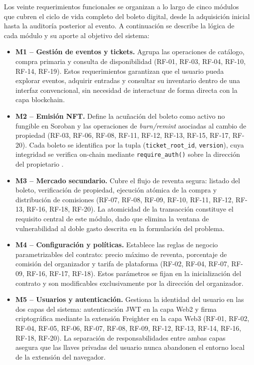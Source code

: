 Los veinte requerimientos funcionales se organizan a lo largo de cinco módulos que cubren el ciclo de vida
completo del boleto digital, desde la adquisición inicial hasta la auditoría posterior al evento. A
continuación se describe la lógica de cada módulo y su aporte al objetivo del sistema:

\begin{itemize}
    \item \textbf{M1 -- Gestión de eventos y tickets.} Agrupa las operaciones de catálogo, compra primaria y
consulta 
    de disponibilidad (RF-01, RF-03, RF-04, RF-10, RF-14, RF-19). Estos requerimientos garantizan que el
usuario pueda 
    explorar eventos, adquirir entradas y consultar su inventario dentro de una interfaz convencional, sin
necesidad de 
    interactuar de forma directa con la capa blockchain.

    \item \textbf{M2 -- Emisión NFT.} Define la acuñación del boleto como activo no fungible en Soroban y las
operaciones 
    de \textit{burn/remint} asociadas al cambio de propiedad (RF-03, RF-06, RF-08, RF-11, RF-12, RF-13,
RF-15, RF-17, RF-20). 
    Cada boleto se identifica por la tupla (\texttt{ticket\_root\_id}, \texttt{version}), cuya integridad se
verifica 
    on-chain mediante \texttt{require\_auth()} sobre la dirección del propietario \cite{sdf2024soroban}.

    \item \textbf{M3 -- Mercado secundario.} Cubre el flujo de reventa segura: listado del boleto,
verificación de 
    propiedad, ejecución atómica de la compra y distribución de comisiones (RF-07, RF-08, RF-09, RF-10,
RF-11, RF-12, 
    RF-13, RF-16, RF-18, RF-20). La atomicidad de la transacción constituye el requisito central de este
módulo, dado 
    que elimina la ventana de vulnerabilidad al doble gasto descrita en la formulación del problema.

    \item \textbf{M4 -- Configuración y políticas.} Establece las reglas de negocio parametrizables del
contrato: precio 
    máximo de reventa, porcentaje de comisión del organizador y tarifa de plataforma (RF-02, RF-04, RF-07,
RF-09, RF-16, 
    RF-17, RF-18). Estos parámetros se fijan en la inicialización del contrato y son modificables
exclusivamente por la 
    dirección del organizador.

    \item \textbf{M5 -- Usuarios y autenticación.} Gestiona la identidad del usuario en las dos capas del
sistema: 
    autenticación JWT en la capa Web2 y firma criptográfica mediante la extensión Freighter en la capa Web3
(RF-01, 
    RF-02, RF-04, RF-05, RF-06, RF-07, RF-08, RF-09, RF-12, RF-13, RF-14, RF-16, RF-18, RF-20). La separación
de 
    responsabilidades entre ambas capas asegura que las llaves privadas del usuario nunca abandonen el
entorno local 
    de la extensión del navegador.
\end{itemize}

